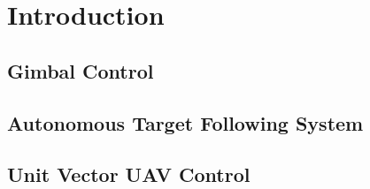 \chapter{Introduction}

\section{Gimbal Control}

\section{Autonomous Target Following System}

\section{Unit Vector UAV Control}